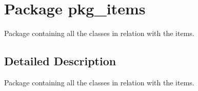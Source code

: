 \hypertarget{namespacepkg__items}{\section{Package pkg\-\_\-items}
\label{namespacepkg__items}
}


Package containing all the classes in relation with the items.  




\subsection{Detailed Description}
Package containing all the classes in relation with the items. 